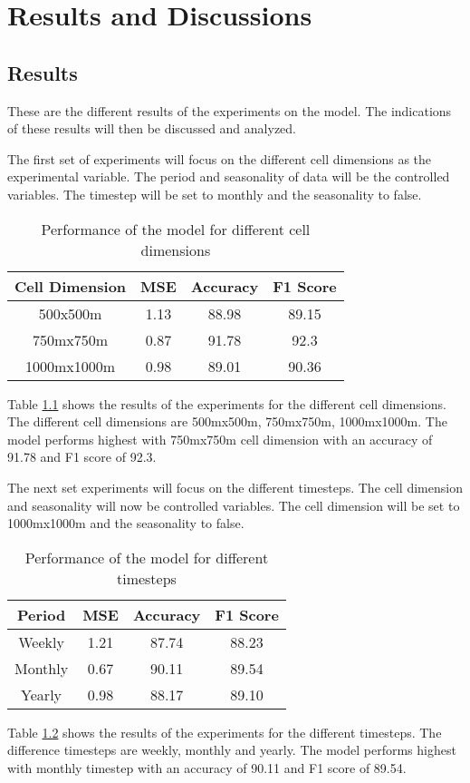 \chapter{Results and Discussions}
\section{Results}
    These are the different results of the experiments on the model. The indications of these results will then be discussed and analyzed.

    The first set of experiments will focus on the different cell dimensions as the experimental variable. The period and seasonality of data will be the controlled variables. The timestep will be set to monthly and the seasonality to false.

    \begin{table}[H]
      \centering
      \begin{tabular}{|c|c|c|c|}
            \hline
          \textbf{Cell Dimension}  &\textbf{MSE}  &\textbf{Accuracy} &\textbf{F1 Score}\\ 
          \hline
          500x500m &1.13 &88.98 &89.15 \\
          750mx750m &0.87 &91.78 &92.3 \\
          1000mx1000m  &0.98 &89.01 &90.36 \\
          \hline
        \end{tabular}
      \caption{Performance of the model for different cell dimensions}
      \label{table:dimension-results}
    \end{table}
    Table \ref{table:dimension-results} shows the results of the experiments for the different cell dimensions. The different cell dimensions are 500mx500m, 750mx750m, 1000mx1000m. The model performs highest with 750mx750m cell dimension with an accuracy of 91.78 and F1 score of 92.3.

    The next set experiments will focus on the different timesteps. The cell dimension and seasonality will now be controlled variables. The cell dimension will be set to 1000mx1000m and the seasonality to false.

    \begin{table}[H]
      \centering
      \begin{tabular}{|c|c|c|c|}
            \hline
          \textbf{Period}  &\textbf{MSE}  &\textbf{Accuracy} &\textbf{F1 Score}\\ 
          \hline
          Weekly &1.21 &87.74 &88.23 \\
          Monthly &0.67 &90.11 &89.54 \\
          Yearly   &0.98 &88.17 &89.10 \\
          \hline
        \end{tabular}
      \caption{Performance of the model for different timesteps}
      \label{table:timestep-results}
    \end{table}
    Table \ref{table:timestep-results} shows the results of the experiments for the different timesteps. The difference timesteps are weekly, monthly and yearly. The model performs highest with monthly timestep with an accuracy of 90.11 and F1 score of 89.54.


